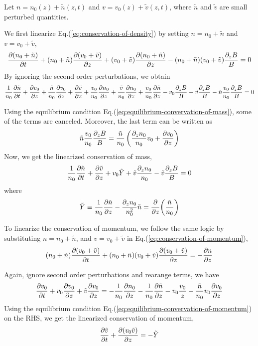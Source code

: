 Let $n = n_0(z) + \tilde{n}(z,t)$ and $v = v_0(z) + \tilde{v}(z,t)$, where $\tilde{n}$ and $\tilde{v}$ are small perturbed quantities.

We first linearize Eq.(\ref{eq:conservation-of-density}) by setting $n=n_0+\tilde{n}$ and $v=v_0+\tilde{v}$,
\[    \pdv{(n_0+\tilde{n})}{t} 
	+ (n_0+\tilde{n})\pdv{(v_0+\tilde{v})}{z} 
	+ (v_0+\tilde{v})\pdv{(n_0+\tilde{n})}{z} 
	- (n_0+\tilde{n})(v_0+\tilde{v})\frac{\partial_z B}{B} = 0 
\]
By ignoring the second order perturbations, we obtain
\[ \frac{1}{n_0}\pdv{\tilde{n}}{t} 
+ \pdv{v_0}{z} + \frac{\tilde{n}}{n_0}\pdv{v_0}{z} + \pdv{\tilde{v}}{z}
+ \frac{v_0}{n_0}\pdv{n_0}{z} + \frac{\tilde{v}}{n_0}\pdv{n_0}{z} + \frac{v_0}{n_0}\pdv{\tilde{n}}{z} 
- v_0\frac{\partial_z B}{B} - \tilde{v}\frac{\partial_z B}{B} - \tilde{n}\frac{v_0}{n_0}\frac{\partial_z B}{B} = 0 
\]


Using the equilibrium condition Eq.(\ref{eq:equilibrium-convervation-of-mass}), some of the terms are canceled. Moreover, the last term can be written as 
\[ \tilde{n}\frac{v_0}{n_0}\frac{\partial_z B}{B} = \frac{\tilde{n}}{n_0}\left( \frac{\partial_z n_0}{n_0}v_0 + \pdv{v_0}{z} \right) \]
Now, we get the linearized conservation of mass,
\begin{equation} \label{eq:linearized-conservation-of-density}
	\frac{1}{n_0}\pdv{\tilde{n}}{t} 
        + \pdv{\tilde{v}}{z} + v_0\tilde{Y} + \tilde{v}\frac{\partial_z n_0}{n_0} - \tilde{v}\frac{\partial_z B}{B} = 0 
\end{equation}
where 
\[ \tilde{Y} \equiv \frac{1}{n_0}\pdv{\tilde{n}}{z} - \frac{\partial_z n_0}{n_0^2}\tilde{n} = \pdv{z}(\frac{\tilde{n}}{n_0}) \] 

To linearize the conservation of momentum, we follow the same logic by substituting $n=n_0+\tilde{n}$, and $v=v_0+\tilde{v}$ in Eq.(\ref{eq:conservation-of-momentum}),
\[ (n_0+\tilde{n})\pdv{(v_0+\tilde{v})}{t} + (n_0+\tilde{n})(v_0+\tilde{v})\pdv{(v_0+\tilde{v})}{z} = -\pdv{n}{z} \]

Again, ignore second order perturbations and rearange terms, we have
\[ \pdv{v_0}{t} + v_0\pdv{v_0}{z} + \tilde{v}\pdv{v_0}{z} 
= -\frac{1}{n_0}\pdv{n_0}{z} -\frac{1}{n_0}\pdv{\tilde{n}}{z} -v_0\frac{v_0}{z} - \frac{\tilde{n}}{n_0}v_0\pdv{v_0}{z} \]
Using the equilibrium condition Eq.(\ref{eq:equilibrium-convervation-of-momentum}) on the RHS, we get the linearized conservation of momentum,
\begin{equation} \label{eq:linearized-conservation-of-momentum}
	\pdv{\tilde{v}}{t} + \pdv{(v_0\tilde{v})}{z} = -\tilde{Y}	
\end{equation}

